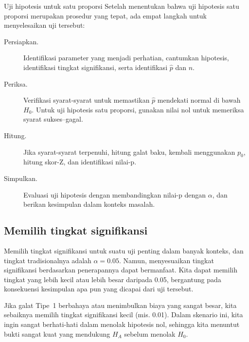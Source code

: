 

\newcommand{\oneprophtsummary}{
\begin{onebox}{Uji hipotesis untuk satu proporsi}
  Setelah menentukan bahwa uji hipotesis satu proporsi merupakan
  prosedur yang tepat, ada empat langkah untuk menyelesaikan
  uji tersebut:
  \begin{description}
  \item[Persiapkan.]
      Identifikasi parameter yang menjadi perhatian,
      cantumkan hipotesis,
      identifikasi tingkat signifikansi,
      serta identifikasi $\hat{p}$ dan $n$.
  \item[Periksa.]
      Verifikasi syarat-syarat
      untuk memastikan $\hat{p}$ mendekati normal di bawah $H_0$.
      Untuk uji hipotesis satu proporsi, gunakan nilai
      nol untuk memeriksa syarat sukses--gagal.
  \item[Hitung.]
      Jika syarat-syarat terpenuhi, hitung galat
      baku, kembali menggunakan $p_0$, hitung skor-Z,
      dan identifikasi nilai-p.
  \item[Simpulkan.]
      Evaluasi uji hipotesis dengan membandingkan nilai-p
      dengan $\alpha$, dan berikan kesimpulan dalam konteks
      masalah.
  \end{description}
\end{onebox}
}
\oneprophtsummary{}



\subsection{Memilih tingkat signifikansi}
\label{significanceLevel}


Memilih tingkat signifikansi untuk suatu uji penting dalam
banyak konteks, dan tingkat tradisionalnya adalah $\alpha = 0.05$.
Namun, menyesuaikan tingkat signifikansi berdasarkan
penerapannya dapat bermanfaat. Kita dapat memilih tingkat yang
lebih kecil atau lebih besar daripada 0.05, bergantung pada konsekuensi
kesimpulan apa pun yang dicapai dari uji tersebut.

Jika galat Tipe~1 berbahaya atau menimbulkan biaya yang sangat besar,
kita sebaiknya memilih tingkat signifikansi kecil (mis. 0.01).
Dalam skenario ini, kita ingin sangat berhati-hati dalam
menolak hipotesis nol, sehingga kita menuntut bukti sangat kuat
yang mendukung $H_A$ sebelum menolak $H_0$.

